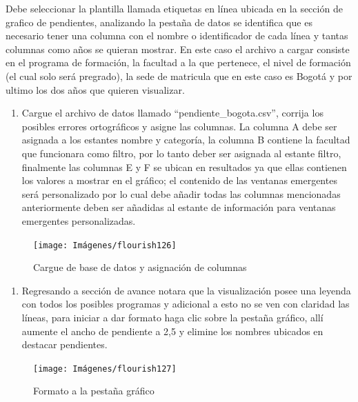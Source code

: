 \documentclass[
]{book}
\providecommand{\tightlist}{%
  \setlength{\itemsep}{0pt}\setlength{\parskip}{0pt}}
\begin{document}
Debe seleccionar la plantilla llamada etiquetas en línea ubicada en la sección de grafico de pendientes, analizando la pestaña de datos se identifica que es necesario tener una columna con el nombre o identificador de cada línea y tantas columnas como años se quieran mostrar. En este caso el archivo a cargar consiste en el programa de formación, la facultad a la que pertenece, el nivel de formación (el cual solo será pregrado), la sede de matricula que en este caso es Bogotá y por ultimo los dos años que quieren visualizar.

\begin{enumerate}
\def\labelenumi{\arabic{enumi}.}
\tightlist
\item
  Cargue el archivo de datos llamado ``pendiente\_bogota.csv'', corrija los posibles errores ortográficos y asigne las columnas. La columna A debe ser asignada a los estantes nombre y categoría, la columna B contiene la facultad que funcionara como filtro, por lo tanto deber ser asignada al estante filtro, finalmente las columnas E y F se ubican en resultados ya que ellas contienen los valores a mostrar en el gráfico; el contenido de las ventanas emergentes será personalizado por lo cual debe añadir todas las columnas mencionadas anteriormente deben ser añadidas al estante de información para ventanas emergentes personalizadas.
\end{enumerate}

\begin{figure}

{\centering \texttt{[image: Imágenes/flourish126]} 

}

\caption{Cargue de base de datos y asignación de columnas}\label{fig:paso1pendienteflourish-fig}
\end{figure}

\begin{enumerate}
\def\labelenumi{\arabic{enumi}.}
\setcounter{enumi}{1}
\tightlist
\item
  Regresando a sección de avance notara que la visualización posee una leyenda con todos los posibles programas y adicional a esto no se ven con claridad las líneas, para iniciar a dar formato haga clic sobre la pestaña gráfico, allí aumente el ancho de pendiente a 2,5 y elimine los nombres ubicados en destacar pendientes.
\end{enumerate}

\begin{figure}

{\centering \texttt{[image: Imágenes/flourish127]} 

}

\caption{Formato a la pestaña gráfico}\label{fig:paso2pendienteflourish-fig}
\end{figure}
\end{document}
